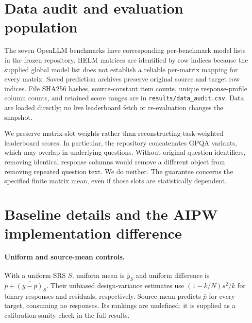 \documentclass{article}
\begin{document}
\section{Data audit and evaluation population}
\label{app:data}
\begin{table}[h]
\centering\small
\caption{Actual matrix dimensions and deterministic row exclusions. ``Duplicates'' counts repeated response profiles after removing all-zero rows. All original item columns are retained.}

\end{table}
The seven OpenLLM benchmarks have corresponding per-benchmark model lists in the frozen repository. HELM matrices are identified by row indices because the supplied global model list does not establish a reliable per-matrix mapping for every matrix. Saved prediction archives preserve original source and target row indices. File SHA256 hashes, source-constant item counts, unique response-profile column counts, and retained score ranges are in \texttt{results/data\_audit.csv}. Data are loaded directly; no live leaderboard fetch or re-evaluation changes the snapshot.

We preserve matrix-slot weights rather than reconstructing task-weighted leaderboard scores. In particular, the repository concatenates GPQA variants, which may overlap in underlying questions. Without original question identifiers, removing identical response columns would remove a different object from removing repeated question text. We do neither. The guarantee concerns the specified finite matrix mean, even if those slots are statistically dependent.

\section{Baseline details and the AIPW implementation difference}
\label{app:baselines}
\paragraph{Uniform and source-mean controls.}
With a uniform SRS $S$, uniform mean is $\bar y_S$ and uniform difference is $\bar p+\overline{(y-p)}_S$. Their unbiased design-variance estimates use $(1-k/N)s^2/k$ for binary responses and residuals, respectively. Source mean predicts $\bar p$ for every target, consuming no responses. Its rankings are undefined; it is supplied as a calibration sanity check in the full results.
\end{document}
